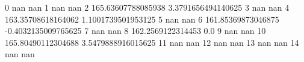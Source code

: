 0 nan nan
1 nan nan
2 165.63607788085938 3.3791656494140625
3 nan nan
4 163.35708618164062 1.1001739501953125
5 nan nan
6 161.85369873046875 -0.4032135009765625
7 nan nan
8 162.2569122314453 0.0
9 nan nan
10 165.80490112304688 3.5479888916015625
11 nan nan
12 nan nan
13 nan nan
14 nan nan
